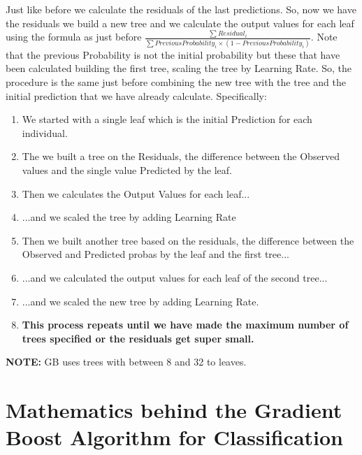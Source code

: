 \documentclass[12pt, a4paper]{article} %
\begin{document}
Just like before we calculate the residuals of the last predictions. So, now we have the residuals we build a new tree and we calculate the output values for each leaf using the formula as just before $\frac{\sum Residual_{i}}{\sum Previous Probability_{i} \times (1 - Previous Probability_{i})}$. Note that the previous Probability is not the initial probability but these that have been calculated building the first tree, scaling the tree by Learning Rate. So, the procedure is the same just before combining the new tree with the tree and the initial prediction that we have already calculate. Specifically:
\begin{enumerate}

    \item We started with a single leaf which is the initial Prediction for each individual.
    
    \item The we built a tree on the Residuals, the difference between the Observed values and the single value Predicted by the leaf.
    
    \item Then we calculates the Output Values for each leaf...
    
    \item ...and we scaled the tree by adding Learning Rate
    
    \item Then we built another tree based on the residuals, the difference between the Observed and Predicted probas by the leaf and the first tree...
    
    \item ...and we calculated the output values for each leaf of the second tree...
    
    \item ...and we scaled the new tree by adding Learning Rate.
    
    \item \textbf{This process repeats until we have made the maximum number of trees specified or the residuals get super small.}
\end{enumerate}


\textbf{NOTE:} GB uses trees with between 8 and 32 to leaves.


\section{Mathematics behind the Gradient Boost Algorithm for Classification}
\end{document}
